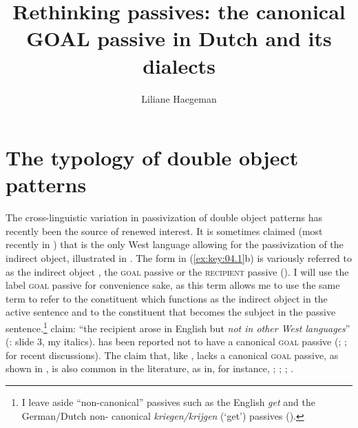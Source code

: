 \documentclass[output=paper]{langsci/langscibook}
\author{Liliane Haegeman\affiliation{Ghent University}}
\title{Rethinking passives: the canonical GOAL passive in Dutch and its
dialects}
\begin{document}
\glsresetall

\section{The typology of double object patterns}\label{sec:key:04.1}

The cross-linguistic variation in passivization of double object patterns has
recently been the source of renewed interest. It
is sometimes claimed (most recently in \citealt{SteinTripsIngham2016}) that
 is the only West  language allowing for the passivization
of the indirect object, illustrated in . The 
form in (\ref{ex:key:04.1}b) is variously referred to as the indirect object
, the \textsc{goal} passive
\parencite{HaddicanHolmberg2012,HaddicanHolmberg2015}
or the \textsc{recipient} passive (\citealt{SteinTripsIngham2016}). I will use
the label \textsc{goal} passive for convenience sake, as this term allows me to
use the same term to refer to the constituent which functions as the indirect
object in the active sentence and to the constituent that becomes the subject
in the passive sentence.\footnote{I leave aside \enquote{non-canonical}
passives such as the English \emph{get}  and the German/Dutch non-
canonical \emph{kriegen/krijgen} (‘get’) passives (\citealt{AleScha2013}).}
\citeauthor{SteinTripsIngham2016} claim: “the recipient  arose in
English but \emph{not in other West  languages}”
(\citeyear{SteinTripsIngham2016}: slide 3, my italics).  has been
reported not to have a canonical \textsc{goal} passive 
(\citet[70]{Anagnostopoulou2003}; \citet[9]{AleScha2013};
\citet[10]{Aleetal2014} for recent discussions). The claim that, like
,  lacks a canonical \textsc{goal} passive, as shown in
, is also common in the literature, as in, for instance,
\textcite{BroekhuisCornips2004,BroekhuisCornips2012};
\textcite{Broekhuisetal2015}; \citet[8]{AleScha2013};
\textcite[10]{Aleetal2014}.

\ea\label{ex:key:04.1} \textcite{HaddicanHolmberg2012,HaddicanHolmberg2015}
    \z
\z

\ea\label{ex:key:04.2}  \parencite[10]{Aleetal2014}
    \z
\z
\end{document}
